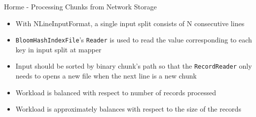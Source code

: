 \documentclass[newPxFont]{beamer}
\begin{document}
\begin{frame}[c]{Horme - Processing Chunks from Network Storage}
\begin{itemize}
  \item With NLineInputFormat, a single input split consists of N consecutive lines
  \item \texttt{BloomHashIndexFile}'s \texttt{Reader} is used to read the value corresponding to each key in input split at mapper
  \item Input should be sorted by binary chunk's path so that the \texttt{RecordReader} only needs to opens a new file when the next line is a new chunk
  \item Workload is balanced with respect to number of records processed
  \item Workload is approximately balances with respect to the size of the records 
\end{itemize}
\end{frame}

\begin{frame}[c]{}
  
\end{frame}
\end{document}
